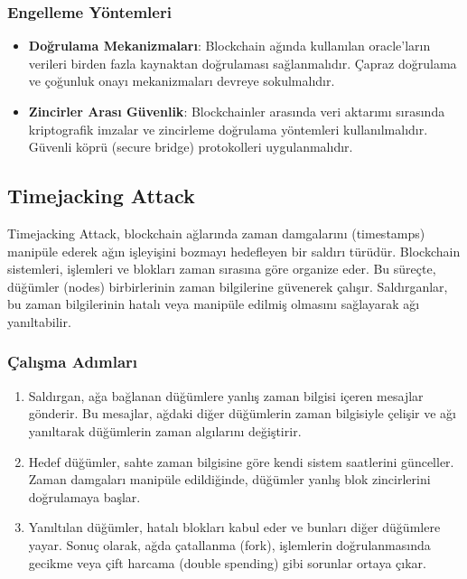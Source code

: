 \subsubsection{Engelleme Yöntemleri}

\begin{itemize}
    \item \textbf{Doğrulama Mekanizmaları}: Blockchain ağında kullanılan oracle’ların verileri birden fazla kaynaktan doğrulaması sağlanmalıdır. Çapraz doğrulama ve çoğunluk onayı mekanizmaları devreye sokulmalıdır.
    \item \textbf{Zincirler Arası Güvenlik}: Blockchainler arasında veri aktarımı sırasında kriptografik imzalar ve zincirleme doğrulama yöntemleri kullanılmalıdır. Güvenli köprü (secure bridge) protokolleri uygulanmalıdır.
\end{itemize}

\newpage

\subsection{Timejacking Attack}

Timejacking Attack, blockchain ağlarında zaman damgalarını (timestamps) manipüle ederek ağın işleyişini bozmayı hedefleyen bir saldırı türüdür. Blockchain sistemleri, işlemleri ve blokları zaman sırasına göre organize eder. Bu süreçte, düğümler (nodes) birbirlerinin zaman bilgilerine güvenerek çalışır. Saldırganlar, bu zaman bilgilerinin hatalı veya manipüle edilmiş olmasını sağlayarak ağı yanıltabilir. 

\subsubsection{Çalışma Adımları}

\begin{enumerate}
    \item Saldırgan, ağa bağlanan düğümlere yanlış zaman bilgisi içeren mesajlar gönderir. Bu mesajlar, ağdaki diğer düğümlerin zaman bilgisiyle çelişir ve ağı yanıltarak düğümlerin zaman algılarını değiştirir. 
    \item Hedef düğümler, sahte zaman bilgisine göre kendi sistem saatlerini günceller. Zaman damgaları manipüle edildiğinde, düğümler yanlış blok zincirlerini doğrulamaya başlar.
    \item Yanıltılan düğümler, hatalı blokları kabul eder ve bunları diğer düğümlere yayar. Sonuç olarak, ağda çatallanma (fork), işlemlerin doğrulanmasında gecikme veya çift harcama (double spending) gibi sorunlar ortaya çıkar.
\end{enumerate}

